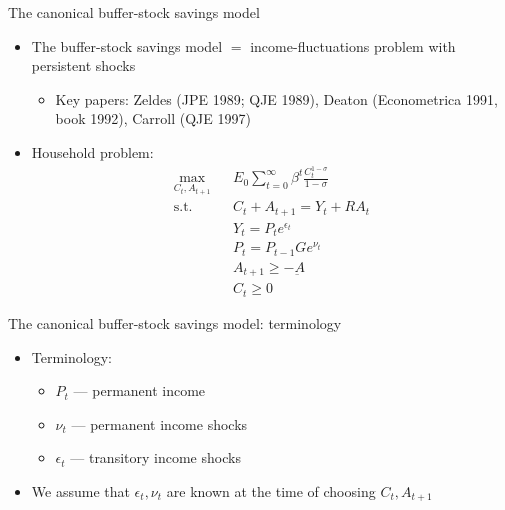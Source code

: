 \documentclass[9pt]{beamer}
\newcommand{\bit}{\begin{itemize}}
\newcommand{\eit}{\end{itemize}}
\begin{document}
\begin{frame}{The canonical buffer-stock savings model}

\bit
\setlength\itemsep{1em}

\item The buffer-stock savings model $=$ income-fluctuations problem with persistent shocks
\bit
	\item Key papers: Zeldes (JPE 1989; QJE 1989), Deaton (Econometrica 1991, book 1992), Carroll (QJE 1997)
\eit

\item Household problem:
\begin{eqnarray}
\max_{C_t, A_{t+1}} && E_0 \sum_{t=0}^{\infty} \beta^t \frac{C_t^{1-\sigma}}{1-\sigma} \nonumber \\
\text{s.t.} && C_t + A_{t+1} = Y_t + R A_t \nonumber \\
&& Y_{t} = P_{t} e^{\epsilon_{t}} \nonumber \\
&& P_{t} = P_{t-1}G e^{\nu_{t}} \nonumber \\
&& A_{t+1} \geq - \underbar A \nonumber \\
&& C_{t} \geq 0 \nonumber
\end{eqnarray}

\eit

\end{frame}

\begin{frame}{The canonical buffer-stock savings model: terminology}

\bit
\setlength\itemsep{1.5em}

\item Terminology:
\bit
	\item $P_t$ --- permanent income
	\item $\nu_t$ --- permanent income shocks
	\item $\epsilon_t$ --- transitory income shocks
\eit

\item We assume that $\epsilon_{t}, \nu_t$ are known at the time of choosing $C_t, A_{t+1}$

\eit

\end{frame}
\end{document}
